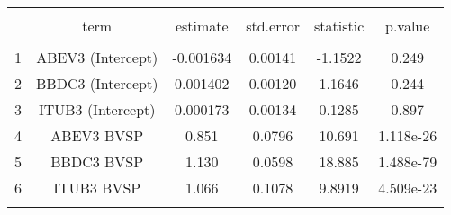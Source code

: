 
\begin{table}[H] \centering 
  \caption{} 
  \label{tb:gmm_capm} 
\begin{tabular}{@{\extracolsep{5pt}} cccccc} 
\\[-1.8ex]\hline 
\hline \\[-1.8ex] 
 & term & estimate & std.error & statistic & p.value \\ 
\hline \\[-1.8ex] 
1 & ABEV3 (Intercept) & -0.001634 & 0.00141 & -1.1522 & 0.249 \\ 
2 & BBDC3 (Intercept) &  0.001402 & 0.00120 &  1.1646 & 0.244 \\ 
3 & ITUB3 (Intercept) &  0.000173 & 0.00134 &  0.1285 & 0.897 \\ 
4 & ABEV3 BVSP & 0.851 & 0.0796 & 10.691 & 1.118e-26 \\ 
5 & BBDC3 BVSP & 1.130 & 0.0598 & 18.885 & 1.488e-79 \\ 
6 & ITUB3 BVSP & 1.066 & 0.1078 & 9.8919 & 4.509e-23 \\ 
\hline \\[-1.8ex] 
\end{tabular} 
\end{table} 
